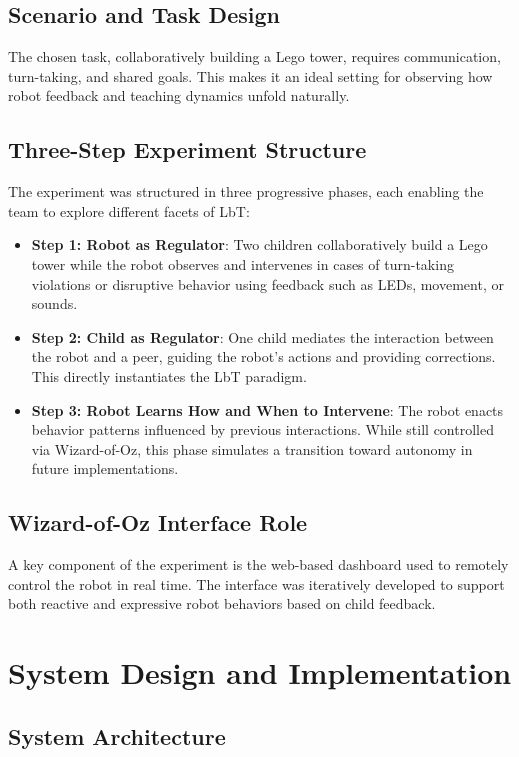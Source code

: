 \documentclass[a4paper]{usiinfbachelorproject}
\begin{document}
\subsection*{\textbf{Scenario and Task Design}}
The chosen task, collaboratively building a Lego tower, requires communication, turn-taking, and shared goals.
This makes it an ideal setting for observing how robot feedback and teaching dynamics unfold naturally.

\subsection*{\textbf{Three-Step Experiment Structure}}
The experiment was structured in three progressive phases, each enabling the team to explore different facets of LbT:

\begin{itemize}
    \item \textbf{Step 1: Robot as Regulator}: Two children collaboratively build a Lego tower while the robot observes and intervenes in cases of turn-taking violations or disruptive behavior using feedback such as LEDs, movement, or sounds.
    \item \textbf{Step 2: Child as Regulator}: One child mediates the interaction between the robot and a peer, guiding the robot's actions and providing corrections. This directly instantiates the LbT paradigm.
    \item \textbf{Step 3: Robot Learns How and When to Intervene}: The robot enacts behavior patterns influenced by previous interactions. While still controlled via Wizard-of-Oz, this phase simulates a transition toward autonomy in future implementations.
\end{itemize}

\subsection*{\textbf{Wizard-of-Oz Interface Role}}
A key component of the experiment is the web-based dashboard used to remotely control the robot in real time.
The interface was iteratively developed to support both reactive and expressive robot behaviors based on child feedback.

\section{\textbf{System Design and Implementation}}\label{sec:system}

\subsection{\textbf{System Architecture}}
\end{document}
